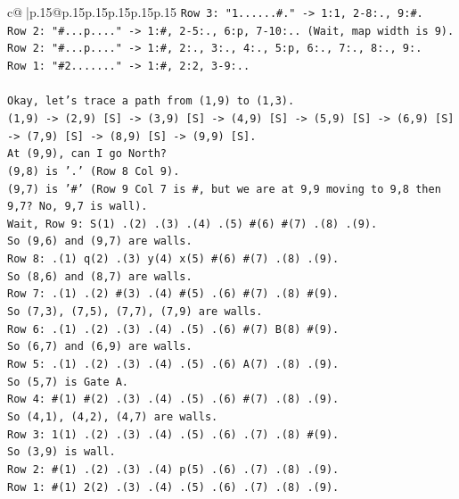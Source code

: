 \documentclass{article}
\begin{document}
{\begin{supertabular}{c@{$\;$}|p{.15\linewidth}@{}p{.15\linewidth}p{.15\linewidth}p{.15\linewidth}p{.15\linewidth}p{.15\linewidth}}
{{{\texttt{Row 3: "1......\#." {-}> 1:1, 2{-}8:., 9:\#.} \\
\texttt{Row 2: "\#...p...." {-}> 1:\#, 2{-}5:., 6:p, 7{-}10:.. (Wait, map width is 9).} \\
\texttt{Row 2: "\#...p...." {-}> 1:\#, 2:., 3:., 4:., 5:p, 6:., 7:., 8:., 9:.} \\
\texttt{Row 1: "\#2......." {-}> 1:\#, 2:2, 3{-}9:..} \\
\\ 
\texttt{Okay, let's trace a path from (1,9) to (1,3).} \\
\texttt{(1,9) {-}> (2,9) {[}S{]} {-}> (3,9) {[}S{]} {-}> (4,9) {[}S{]} {-}> (5,9) {[}S{]} {-}> (6,9) {[}S{]} {-}> (7,9) {[}S{]} {-}> (8,9) {[}S{]} {-}> (9,9) {[}S{]}.} \\
\texttt{At (9,9), can I go North?} \\
\texttt{(9,8) is '.' (Row 8 Col 9).} \\
\texttt{(9,7) is '\#' (Row 9 Col 7 is \#, but we are at 9,9 moving to 9,8 then 9,7? No, 9,7 is wall).} \\
\texttt{Wait, Row 9: S(1) .(2) .(3) .(4) .(5) \#(6) \#(7) .(8) .(9).} \\
\texttt{So (9,6) and (9,7) are walls.} \\
\texttt{Row 8: .(1) q(2) .(3) y(4) x(5) \#(6) \#(7) .(8) .(9).} \\
\texttt{So (8,6) and (8,7) are walls.} \\
\texttt{Row 7: .(1) .(2) \#(3) .(4) \#(5) .(6) \#(7) .(8) \#(9).} \\
\texttt{So (7,3), (7,5), (7,7), (7,9) are walls.} \\
\texttt{Row 6: .(1) .(2) .(3) .(4) .(5) .(6) \#(7) B(8) \#(9).} \\
\texttt{So (6,7) and (6,9) are walls.} \\
\texttt{Row 5: .(1) .(2) .(3) .(4) .(5) .(6) A(7) .(8) .(9).} \\
\texttt{So (5,7) is Gate A.} \\
\texttt{Row 4: \#(1) \#(2) .(3) .(4) .(5) .(6) \#(7) .(8) .(9).} \\
\texttt{So (4,1), (4,2), (4,7) are walls.} \\
\texttt{Row 3: 1(1) .(2) .(3) .(4) .(5) .(6) .(7) .(8) \#(9).} \\
\texttt{So (3,9) is wall.} \\
\texttt{Row 2: \#(1) .(2) .(3) .(4) p(5) .(6) .(7) .(8) .(9).} \\
\texttt{Row 1: \#(1) 2(2) .(3) .(4) .(5) .(6) .(7) .(8) .(9).} \\
}}}
\end{supertabular}}
\end{document}
